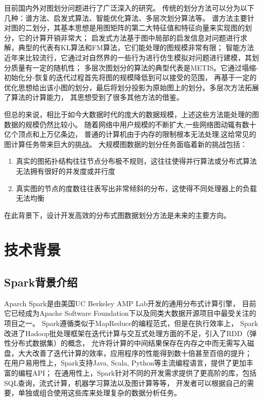 \documentclass[master]{njuthesis}
\begin{document}
目前国内外对图划分问题进行了广泛深入的研究。
传统的划分方法可以分为以下几种：谱方法、启发式算法、智能优化算法、多层次划分算法等。
谱方法\cite{DBLP:journals/siamsc/HendricksonL95}主要针对图的二划分，其基本思想是用图矩阵的第二大特征值和特征向量来实现图的划分，它的计算开销非常大；
启发式方法基于图中局部的启发信息对问题进行求解，典型的代表有KL\cite{kernighan1970efficient}算法和FM\cite{fiduccia1988linear}算法，它们能处理的图规模非常有限；
智能方法近年来比较流行，它通过对自然界的一些行为进行仿生模拟对问题进行建模，其划分质量有一定的随机性；
多层次图划分的算法的典型代表是METIS\cite{Karypis95metis}。它通过塌缩-初始化分-恢复的迭代过程首先将图的规模降低到可以接受的范围，
再基于一定的优化思想给出该小图的划分，最后将划分投影为原始图上的划分。多层次方法拓展了算法的计算能力，
其思想受到了很多其他方法的借鉴。

但总的来说，相比于如今大数据时代的庞大的数据规模，上述这些方法能处理的图数据的规模仍然比较小。
随着网络中用户规模的不断扩大,一些网络图动辄有数十亿个顶点和上万亿条边，
普通的计算机由于内存的限制根本无法处理,这给常见的图计算任务带来巨大的挑战。
大规模图数据的划分任务面临着新的挑战包括：
\begin{enumerate}
 \item 真实的图拓扑结构往往节点分布极不规则，这往往使得并行算法或分布式算法无法拥有很好的并发度或并行度
 \item 真实图的节点的度数往往表写出非常倾斜的分布，这使得不同处理器上的负载无法均衡
\end{enumerate}
在此背景下，设计开发高效的分布式图数据划分方法是未来的主要方向。

\section{技术背景}
\subsection{Spark背景介绍}
Aparch Spark\cite{DBLP:conf/hotcloud/ZahariaCFSS10}是由美国UC Berkeley AMP Lab开发的通用分布式计算引擎，
目前它已经成为Apache Software Foundation下以及同类大数据开源项目中最受关注的项目之一。
Spark遵循类似于MapReduce的编程范式，但是在执行效率上，
Spark改进了Hadoop\cite{DBLP:conf/osdi/DeanG04}批处理框架在迭代计算与交互式处理方面的不足，引入了RDD（弹性分布式数据集）的概念，
允许将计算的中间结果保存在内存之中而无需写入磁盘，大大改善了迭代计算的效率，应用程序的性能得到数十倍甚至百倍的提升；
在用户易用性上，Spark支持Java, Scala, Python等主流编程语言，提供了更加丰富的编程API；
在通用性上，Spark针对不同的开发需求提供了更高阶的库，包括SQL查询，流式计算，机器学习算法以及图计算等等，
开发者可以根据自己的需要，单独或组合使用这些库来处理复杂的数据分析任务。
\end{document}
